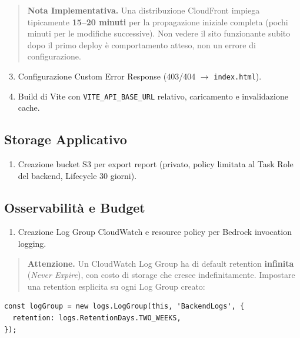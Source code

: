 \documentclass[11pt,a4paper]{article}
\begin{document}
\begin{quote}
\textbf{Nota Implementativa.} Una distribuzione CloudFront impiega tipicamente \textbf{15--20 minuti} per la propagazione iniziale completa (pochi minuti per le modifiche successive). Non vedere il sito funzionante subito dopo il primo deploy è comportamento atteso, non un errore di configurazione.
\end{quote}

\begin{enumerate}
    \setcounter{enumi}{2}
    \item Configurazione Custom Error Response (403/404 $\to$ \texttt{index.html}).
    \item Build di Vite con \texttt{VITE\_API\_BASE\_URL} relativo, caricamento e invalidazione cache.
\end{enumerate}

\subsection{Storage Applicativo}

\begin{enumerate}
    \item Creazione bucket S3 per export report (privato, policy limitata al Task Role del backend, Lifecycle 30 giorni).
\end{enumerate}

\subsection{Osservabilità e Budget}

\begin{enumerate}
    \item Creazione Log Group CloudWatch e resource policy per Bedrock invocation logging.
\end{enumerate}

\begin{quote}
\textbf{Attenzione.} Un CloudWatch Log Group ha di default retention \textbf{infinita} (\emph{Never Expire}), con costo di storage che cresce indefinitamente. Impostare una retention esplicita su ogni Log Group creato:
\end{quote}

\begin{lstlisting}[caption={Retention esplicita sul Log Group}]
const logGroup = new logs.LogGroup(this, 'BackendLogs', {
  retention: logs.RetentionDays.TWO_WEEKS,
});
\end{lstlisting}
\end{document}
